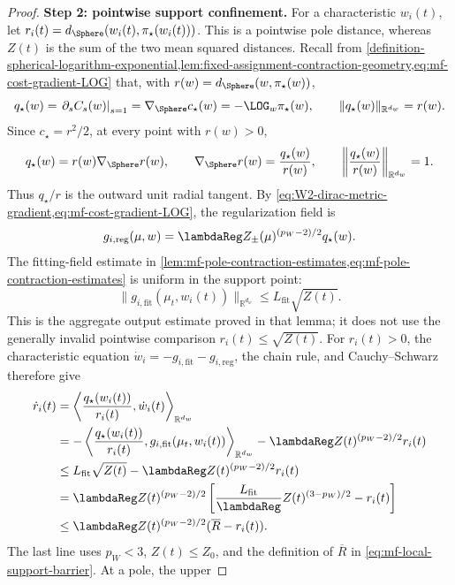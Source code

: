 \begin{proof}
\par\noindent\textbf{Step 2: pointwise support confinement.}
For a characteristic \(w_i(t)\), let
\(r_i(t)=d_\Sphere(w_i(t),\pi_\star(w_i(t)))\). This is a pointwise pole
distance, whereas \(Z(t)\) is the sum of the two mean squared distances.
Recall from
\cref{definition-spherical-logarithm-exponential,lem:fixed-assignment-contraction-geometry,eq:mf-cost-gradient-LOG}
that, with \(r(w)=d_\Sphere(w,\pi_\star(w))\),
\[
 q_\star(w)
 =\left.\partial_sC_s(w)\right|_{s=1}
 =\nabla_\Sphere c_\star(w)
 =-\LOG_w\pi_\star(w),
 \qquad
 \|q_\star(w)\|_{\mathbb R^{d_w}}=r(w).
\]
Since \(c_\star=r^2/2\), at every point with \(r(w)>0\),
\[
 q_\star(w)=r(w)\nabla_\Sphere r(w),
 \qquad
 \nabla_\Sphere r(w)=\frac{q_\star(w)}{r(w)},
 \qquad
 \left\|\frac{q_\star(w)}{r(w)}\right\|_{\mathbb R^{d_w}}=1.
\]
Thus \(q_\star/r\) is the outward unit radial tangent. By
\cref{eq:W2-dirac-metric-gradient,eq:mf-cost-gradient-LOG}, the
regularization field is
\[
 g_{i,\mathrm{reg}}(\mu,w)
 =\lambdaReg Z_\pm(\mu)^{(p_W-2)/2}q_\star(w).
\]
The fitting-field estimate in
\cref{lem:mf-pole-contraction-estimates,eq:mf-pole-contraction-estimates}
is uniform in the support point:
\[
 \|g_{i,\mathrm{fit}}(\mu_t,w_i(t))\|_{\mathbb R^{d_w}}
 \le L_{\mathrm{fit}}\sqrt{Z(t)}.
\]
This is the aggregate output estimate proved in that lemma; it does not use
the generally invalid pointwise comparison \(r_i(t)\le\sqrt{Z(t)}\).
For \(r_i(t)>0\), the characteristic equation
\(\dot w_i=-g_{i,\mathrm{fit}}-g_{i,\mathrm{reg}}\), the chain rule, and
Cauchy--Schwarz therefore give
\begin{align}
 \dot r_i(t)
 &=\left\langle\frac{q_\star(w_i(t))}{r_i(t)},\dot w_i(t)
          \right\rangle_{\mathbb R^{d_w}}\notag\\
 &=-\left\langle\frac{q_\star(w_i(t))}{r_i(t)},
                 g_{i,\mathrm{fit}}(\mu_t,w_i(t))
          \right\rangle_{\mathbb R^{d_w}}
       -\lambdaReg Z(t)^{(p_W-2)/2}r_i(t)\notag\\
 &\le L_{\mathrm{fit}}\sqrt{Z(t)}
       -\lambdaReg Z(t)^{(p_W-2)/2}r_i(t)\notag\\
 &=\lambdaReg Z(t)^{(p_W-2)/2}
       \left[\frac{L_{\mathrm{fit}}}{\lambdaReg}
                    Z(t)^{(3-p_W)/2}-r_i(t)\right]\notag\\
 &\le\lambdaReg Z(t)^{(p_W-2)/2}(\overline R-r_i(t)).
 \label{eq:mf-pointwise-radius-differential}
\end{align}
The last line uses \(p_W<3\), \(Z(t)\le Z_0\), and the definition of
\(\overline R\) in \cref{eq:mf-local-support-barrier}. At a pole, the upper

\end{proof}

